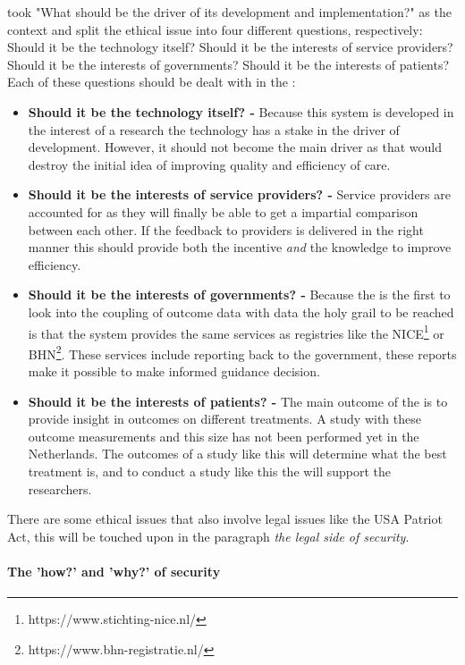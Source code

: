 \cite{s7Kluge2007} took "What should be the driver of its development and implementation?" as the context and split the ethical issue into four different questions, respectively: Should it be the technology itself? Should it be the interests of service providers? Should it be the interests of governments? Should it be the interests of patients?
Each of these questions should be dealt with in the \project{}:

\begin{itemize}
	\item \textbf{Should it be the technology itself? -} Because this system is developed in the interest of a research the technology has a stake in the driver of development.
	However, it should not become the main driver as that would destroy the initial idea of improving quality and efficiency of care.
	\item \textbf{Should it be the interests of service providers? -} Service providers are accounted for as they will finally be able to get a impartial comparison between each other.
	If the feedback to providers is delivered in the right manner this should provide both the incentive \emph{and} the knowledge to improve efficiency.
	\item \textbf{Should it be the interests of governments? -} Because the \project{} is the first to look into the coupling of outcome data with \IVF{} data the holy grail to be reached is that the system provides the same services as registries like the NICE\footnote{https://www.stichting-nice.nl/} or  BHN\footnote{https://www.bhn-registratie.nl/}.
	These services include reporting back to the government, these reports make it possible to make informed guidance decision.
	\item \textbf{Should it be the interests of patients? -} The main outcome of the \project{} is to provide insight in outcomes on different \IVF{} treatments.
	A study with these outcome measurements and this size has not been performed yet in the Netherlands. %
	The outcomes of a study like this will determine what the best treatment is, and to conduct a study like this the \ivfsystem{} will support the researchers.
\end{itemize}

There are some ethical issues that also involve legal issues like the USA Patriot Act, this will be touched upon in the paragraph \emph{the legal side of security}.

\paragraph{The 'how?' and 'why?' of security}
\label{security-how-why}

